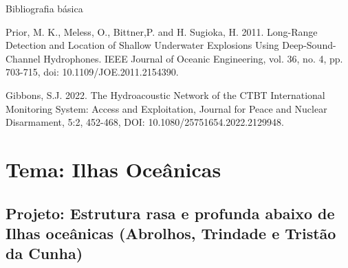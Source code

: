 \documentclass[10pt,a4paper,oneside]{book}
\begin{document}
\begin{fancyenum}{\faBook}{Bibliografia básica}
	\item Prior, M. K., Meless, O., Bittner,P. and H. Sugioka, H. 2011. Long-Range Detection and Location of Shallow Underwater Explosions Using Deep-Sound-Channel Hydrophones. IEEE Journal of Oceanic Engineering, vol. 36, no. 4, pp. 703-715, doi: 10.1109/JOE.2011.2154390.
	\item Gibbons, S.J. 2022. The Hydroacoustic Network of the CTBT International Monitoring System: Access and Exploitation, Journal for Peace and Nuclear Disarmament, 5:2, 452-468, DOI: 10.1080/25751654.2022.2129948.
\end{fancyenum}


\section{Tema: Ilhas Oceânicas}

\subsection{Projeto: Estrutura rasa e profunda abaixo de Ilhas oceânicas (Abrolhos, Trindade e Tristão da Cunha)}
\end{document}
